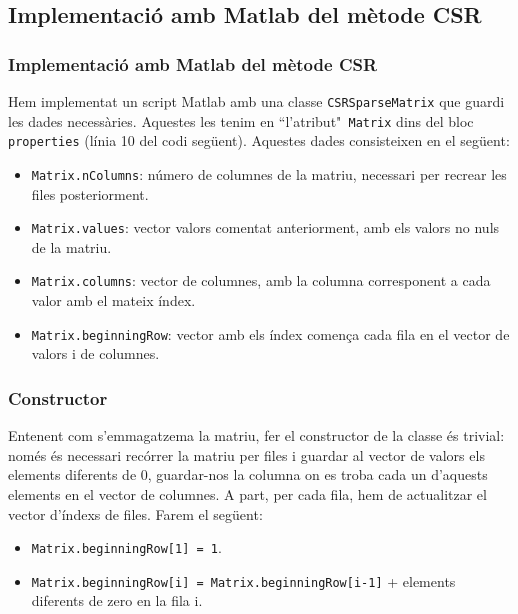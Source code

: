 \documentclass[8pt]{beamer}
\begin{document}
\subsection{Implementació amb Matlab del mètode CSR}
\begin{frame}
  \frametitle{Implementació amb Matlab del mètode CSR}
  Hem implementat un script Matlab amb una classe \texttt{CSRSparseMatrix} que guardi les dades necessàries. Aquestes les tenim en ``l'atribut"\texttt{ Matrix} dins del bloc \texttt{properties} (línia 10 del codi següent). Aquestes dades consisteixen en el següent:	
\begin{itemize}
\item  \texttt{Matrix.nColumns}: número de columnes de la matriu, necessari per recrear les files posteriorment.
\item  \texttt{Matrix.values}: vector valors comentat anteriorment, amb els valors no nuls de la matriu.
\item  \texttt{Matrix.columns}: vector de columnes, amb la columna corresponent a cada valor amb el mateix índex.
\item  \texttt{Matrix.beginningRow}: vector amb els índex comença cada fila en el vector de valors i de columnes.
\end{itemize}
\end{frame}

\begin{frame}
 \end{frame}

\begin{frame}
  \frametitle{Constructor}
  \hypertarget{Constructor}{}
  Entenent com s'emmagatzema la matriu, fer el constructor de la classe és trivial: només és necessari recórrer la matriu per files i guardar al vector de valors els elements diferents de 0, guardar-nos la columna on es troba cada un d'aquests elements en el vector de columnes. A part, per cada fila, hem de actualitzar el vector d'índexs de files. Farem el següent:
\begin{itemize}
\item \texttt{Matrix.beginningRow[1] = 1}.
\item \texttt{Matrix.beginningRow[i] = Matrix.beginningRow[i-1]} + elements diferents de zero en la fila i.
\end{itemize}
\end{frame}

\begin{frame}
  
\end{frame}
\end{document}
